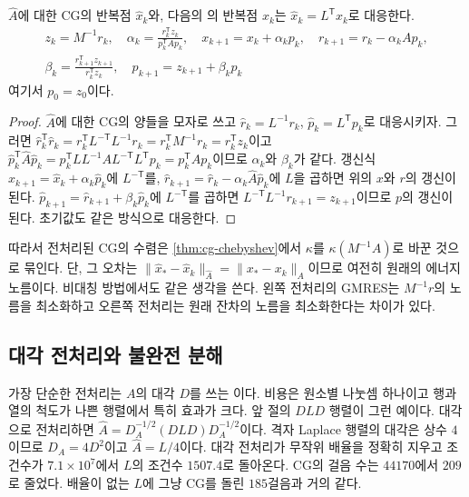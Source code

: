 \begin{proposition}
\label{prop:pcg}
$\hat A$에 대한 CG의 반복점 $\hat x_k$와, 다음의 의 반복점 $x_k$는 $\hat x_k=L^{\mathsf T}x_k$로 대응한다.
\begin{gather*}
z_k=M^{-1}r_k,\quad\alpha_k=\frac{r_k^{\mathsf T}z_k}{p_k^{\mathsf T}Ap_k},\quad x_{k+1}=x_k+\alpha_kp_k,\quad r_{k+1}=r_k-\alpha_kAp_k,\\
\beta_k=\frac{r_{k+1}^{\mathsf T}z_{k+1}}{r_k^{\mathsf T}z_k},\quad p_{k+1}=z_{k+1}+\beta_kp_k
\end{gather*}
여기서 $p_0=z_0$이다.
\end{proposition}

\begin{proof}
$\hat A$에 대한 CG의 양들을 모자로 쓰고 $\hat r_k=L^{-1}r_k$, $\hat p_k=L^{\mathsf T}p_k$로 대응시키자. 그러면 $\hat r_k^{\mathsf T}\hat r_k=r_k^{\mathsf T}L^{-\mathsf T}L^{-1}r_k=r_k^{\mathsf T}M^{-1}r_k=r_k^{\mathsf T}z_k$이고 $\hat p_k^{\mathsf T}\hat A\hat p_k=p_k^{\mathsf T}LL^{-1}AL^{-\mathsf T}L^{\mathsf T}p_k=p_k^{\mathsf T}Ap_k$이므로 $\alpha_k$와 $\beta_k$가 같다. 갱신식 $\hat x_{k+1}=\hat x_k+\alpha_k\hat p_k$에 $L^{-\mathsf T}$를, $\hat r_{k+1}=\hat r_k-\alpha_k\hat A\hat p_k$에 $L$을 곱하면 위의 $x$와 $r$의 갱신이 된다. $\hat p_{k+1}=\hat r_{k+1}+\beta_k\hat p_k$에 $L^{-\mathsf T}$를 곱하면 $L^{-\mathsf T}L^{-1}r_{k+1}=z_{k+1}$이므로 $p$의 갱신이 된다. 초기값도 같은 방식으로 대응한다.
\end{proof}

따라서 전처리된 CG의 수렴은 \cref{thm:cg-chebyshev}에서 $\kappa$를 $\kappa(M^{-1}A)$로 바꾼 것으로 묶인다. 단, 그 오차는 $\|\hat x_\ast-\hat x_k\|_{\hat A}=\|x_\ast-x_k\|_A$이므로 여전히 원래의 에너지 노름이다. 비대칭 방법에서도 같은 생각을 쓴다. 왼쪽 전처리의 GMRES는 $M^{-1}r$의 노름을 최소화하고 오른쪽 전처리는 원래 잔차의 노름을 최소화한다는 차이가 있다.

\subsection{대각 전처리와 불완전 분해}

가장 단순한 전처리는 $A$의 대각 $D$를 쓰는 이다. 비용은 원소별 나눗셈 하나이고 행과 열의 척도가 나쁜 행렬에서 특히 효과가 크다. 앞 절의 $DLD$ 행렬이 그런 예이다. 대각으로 전처리하면 $\hat A=D_A^{-1/2}(DLD)D_A^{-1/2}$이다. 격자 Laplace 행렬의 대각은 상수 $4$이므로 $D_A=4D^2$이고 $\hat A=L/4$이다. 대각 전처리가 무작위 배율을 정확히 지우고 조건수가 $7.1\times10^7$에서 $L$의 조건수 $1507.4$로 돌아온다. CG의 걸음 수는 $44170$에서 $209$로 줄었다. 배율이 없는 $L$에 그냥 CG를 돌린 $185$걸음과 거의 같다.

